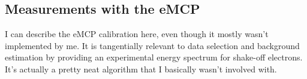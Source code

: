 




\subsection{Measurements with the eMCP}
	I can describe the eMCP calibration here, even though it mostly wasn't implemented by me.  It is tangentially relevant to data selection and background estimation by providing an experimental energy spectrum for shake-off electrons.  It's actually a pretty neat algorithm that I basically wasn't involved with.




